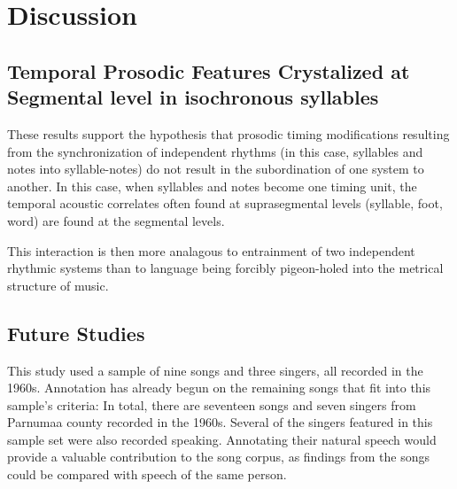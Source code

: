 \chapter{Discussion}
%

\section{Temporal Prosodic Features Crystalized at Segmental level in isochronous syllables}

These results support the hypothesis that prosodic timing modifications resulting from the synchronization of independent rhythms (in this case, syllables and notes into syllable-notes) do not result in the subordination of one system to another. In this case, when syllables and notes become one timing unit, the temporal acoustic correlates often found at suprasegmental levels (syllable, foot, word) are found at the segmental levels. 

This interaction is then more analagous to entrainment of two independent rhythmic systems than to language being forcibly pigeon-holed into the metrical structure of music. 




\section{Future Studies} 

This study used a sample of nine songs and three singers, all recorded in the 1960s. Annotation has already begun on the remaining songs that fit into this sample's criteria: In total, there are seventeen songs and seven singers from Parnumaa county recorded in the 1960s.
Several of the singers featured in this sample set were also recorded speaking. Annotating their natural speech would provide a valuable contribution to the song corpus, as findings from the songs could be compared with speech of the same person.  

